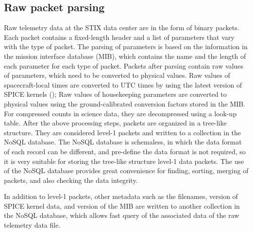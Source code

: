 \documentclass[referee]{aa} %
\begin{document}
\subsection{Raw packet parsing}
Raw telemetry data at the STIX data center are in the form of binary packets. 
Each packet contains a fixed-length header and a list of parameters that vary with the type of packet.  The parsing of parameters is based on the information in 
the mission interface database (MIB), which contains the name and the 
length of each parameter for each type of packet. 
Packets after parsing contain raw values of parameters, 
which need to be converted to physical values. 
Raw values of spacecraft-local times are converted to UTC times by using 
the latest version of SPICE kernels (\cite{spice1996,spice2018});
Raw values of  housekeeping parameters are converted to physical values using 
the  ground-calibrated conversion factors stored in the MIB. 
For compressed counts in science data, they are decompressed using a look-up table. 
After the above processing steps, packets are organized in a tree-like structure. 
They are considered level-1 packets and written to a collection in the NoSQL database. 
The NoSQL database is schemaless, in which the data format of each record can be different, and pre-define the data format is not required, so it is very suitable for storing the tree-like structure level-1 data packets.  
The use of the NoSQL database provides great convenience for finding, sorting, merging of packets, and also checking the data integrity. 

In addition to level-1 packets,  other metadata such as the filenames,  version of SPICE kernel data, and version of the MIB are written to another collection in the NoSQL database, which allows fast query of the associated data of the raw telemetry data file.
\end{document}
